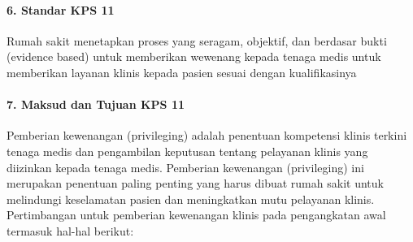 \documentclass[
]{book}
\begin{document}
\hypertarget{standar-kps-11}{%
\paragraph*{6. Standar KPS 11}\label{standar-kps-11}}

Rumah sakit menetapkan proses yang seragam, objektif, dan berdasar bukti (evidence based) untuk memberikan wewenang kepada tenaga medis untuk memberikan layanan klinis kepada pasien sesuai dengan kualifikasinya

\hypertarget{maksud-dan-tujuan-kps-11}{%
\paragraph*{7. Maksud dan Tujuan KPS 11}\label{maksud-dan-tujuan-kps-11}}

Pemberian kewenangan (privileging) adalah penentuan kompetensi klinis terkini tenaga medis dan pengambilan keputusan tentang pelayanan klinis yang diizinkan kepada tenaga medis. Pemberian kewenangan (privileging) ini merupakan penentuan paling penting yang harus dibuat rumah sakit untuk melindungi keselamatan pasien dan meningkatkan mutu pelayanan klinis.
Pertimbangan untuk pemberian kewenangan klinis pada pengangkatan awal termasuk hal-hal berikut:
\end{document}
